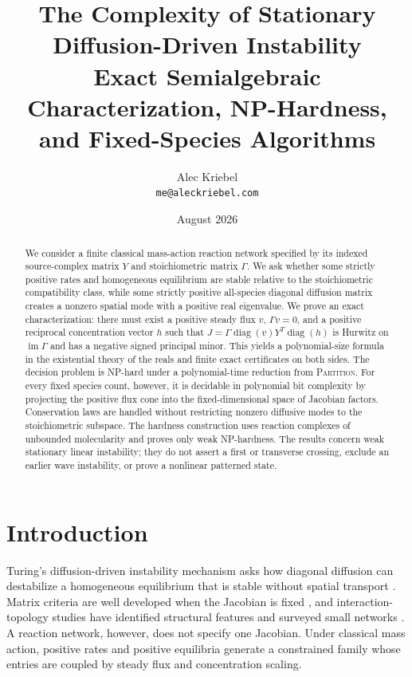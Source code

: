 \documentclass[11pt]{article}
\title{The Complexity of Stationary Diffusion-Driven Instability\\
\large Exact Semialgebraic Characterization, NP-Hardness, and Fixed-Species Algorithms}
\author{Alec Kriebel\\\small \texttt{me@aleckriebel.com}}
\date{August 2026}
\theoremstyle{definition}
\newcommand{\diag}{\operatorname{diag}}
\newcommand{\im}{\operatorname{im}}
\begin{document}
\maketitle

\begin{abstract}
We consider a finite classical mass-action reaction network specified by its
indexed source-complex matrix $Y$ and stoichiometric matrix $\Gamma$.  We ask
whether some strictly positive rates and homogeneous equilibrium are stable
relative to the stoichiometric compatibility class, while some strictly
positive all-species diagonal diffusion matrix creates a nonzero spatial mode
with a positive real eigenvalue.  We prove an exact characterization: there
must exist a positive steady flux $v$, $\Gamma v=0$, and a positive reciprocal
concentration vector $h$ such that
$J=\Gamma\diag(v)Y^T\diag(h)$ is Hurwitz on $\im\Gamma$ and has a negative
signed principal minor.  This yields a polynomial-size formula in the
existential theory of the reals and finite exact certificates on both sides.
The decision problem is NP-hard under a polynomial-time reduction from
\textsc{Partition}.  For every fixed species count, however, it is decidable
in polynomial bit complexity by projecting the positive flux cone into the
fixed-dimensional space of Jacobian factors.  Conservation laws are handled
without restricting nonzero diffusive modes to the stoichiometric subspace.
The hardness construction uses reaction complexes of unbounded molecularity
and proves only weak NP-hardness.  The results concern weak stationary linear
instability; they do not assert a first or transverse crossing, exclude an
earlier wave instability, or prove a nonlinear patterned state.
\end{abstract}

\section{Introduction}

Turing's diffusion-driven instability mechanism asks how diagonal diffusion
can destabilize a homogeneous equilibrium that is stable without spatial
transport \cite{Turing1952}.  Matrix criteria are well developed when the
Jacobian is fixed \cite{Satnoianu2000,WangLi2001,Anma2012,Piskovsky2024}, and
interaction-topology studies have identified structural features and surveyed
small networks \cite{Marcon2016,Diego2018,Scholes2019}.  A reaction network,
however, does not specify one Jacobian.  Under classical mass action, positive
rates and positive equilibria generate a constrained family whose entries are
coupled by steady flux and concentration scaling.
\end{document}
